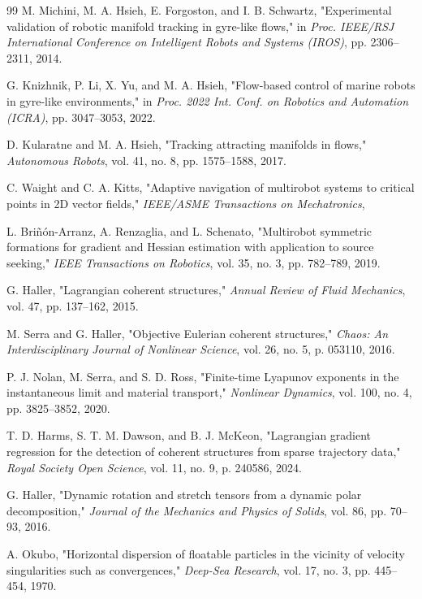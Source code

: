 \documentclass[lettersize,journal]{IEEEtran}
\begin{document}
\begin{thebibliography}{99}
 M. Michini, M. A. Hsieh, E. Forgoston, and I. B. Schwartz,
"Experimental validation of robotic manifold tracking in gyre-like flows,"
in \textit{Proc. IEEE/RSJ International Conference on Intelligent Robots
and Systems (IROS)}, pp. 2306--2311, 2014.

 G. Knizhnik, P. Li, X. Yu, and M. A. Hsieh, "Flow-based control
of marine robots in gyre-like environments," in \textit{Proc. 2022 Int. Conf.
on Robotics and Automation (ICRA)}, pp. 3047--3053, 2022.

 D. Kularatne and M. A. Hsieh, "Tracking attracting manifolds in
flows," \textit{Autonomous Robots}, vol. 41, no. 8, pp. 1575--1588, 2017.

 C. Waight and C. A. Kitts, "Adaptive navigation of multirobot
systems to critical points in 2D vector fields," \textit{IEEE/ASME Transactions
on Mechatronics}, %

 L. Briñón-Arranz, A. Renzaglia, and L. Schenato, "Multirobot
symmetric formations for gradient and Hessian estimation with application to
source seeking," \textit{IEEE Transactions on Robotics}, vol. 35, no. 3,
pp. 782--789, 2019.

 G. Haller, "Lagrangian coherent structures," \textit{Annual
Review of Fluid Mechanics}, vol. 47, pp. 137--162, 2015.

 M. Serra and G. Haller, "Objective Eulerian coherent
structures," \textit{Chaos: An Interdisciplinary Journal of Nonlinear
Science}, vol. 26, no. 5, p. 053110, 2016.

 P. J. Nolan, M. Serra, and S. D. Ross, "Finite-time Lyapunov
exponents in the instantaneous limit and material transport,"
\textit{Nonlinear Dynamics}, vol. 100, no. 4, pp. 3825--3852, 2020.

 T. D. Harms, S. T. M. Dawson, and B. J. McKeon, "Lagrangian
gradient regression for the detection of coherent structures from sparse
trajectory data," \textit{Royal Society Open Science}, vol. 11, no. 9,
p. 240586, 2024.

 G. Haller, "Dynamic rotation and stretch tensors from a
dynamic polar decomposition," \textit{Journal of the Mechanics and Physics
of Solids}, vol. 86, pp. 70--93, 2016.

 A. Okubo, "Horizontal dispersion of floatable particles in the
vicinity of velocity singularities such as convergences," \textit{Deep-Sea
Research}, vol. 17, no. 3, pp. 445--454, 1970.


\end{thebibliography}
\end{document}
